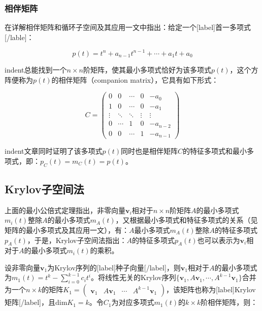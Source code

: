\documentclass[UTF8,nofonts]{ctexart}
\begin{document}
\subsubsection*{相伴矩阵}

在详解相伴矩阵和循环子空间及其应用一文中指出：给定一个[label]首一多项式[/lable]：

\[p(t)=t^n+a_{n-1}t^{n-1}+\cdots+a_1t+a_0\]

indent总能找到一个$n \times n$阶矩阵，使其最小多项式恰好为该多项式$p(t)$，这个方阵便称为$p(t)$的相伴矩阵（companion matrix），它具有如下形式：

\[
C=\begin{pmatrix}
0&0&\cdots&0&-a_0\\
1&0&\cdots&0&-a_1\\
\vdots&\ddots&\ddots&\vdots&\vdots\\
0&\cdots&1&0&-a_{n-2}\\
0&0&\cdots&1&-a_{n-1}
\end{pmatrix}
\]

indent文章同时证明了该多项式$p(t)$同时也是相伴矩阵$C$的特征多项式和最小多项式，即：$p_C(t)=m_C(t)=p(t)$。

\subsection*{Krylov子空间法}

上面的最小公倍式定理指出，非零向量$\boldsymbol{v}_i$相对于$n \times n$阶矩阵$A$的最小多项式$m_i(t)$整除$A$的最小多项式$m_A(t)$，又根据最小多项式和特征多项式的关系（见矩阵的最小多项式及其应用一文），有：$A$最小多项式$m_A(t)$整除$A$的特征多项式$p_A(t)$，于是，Krylov子空间法指出：$A$的特征多项式$p_A(t)$也可以表示为$\boldsymbol{v}_i$相对于$A$的最小多项式$m_i(t)$的乘积。

设非零向量$\boldsymbol{v}_1$为Krylov序列的[label]种子向量[/label]，则$\boldsymbol{v}_1$相对于$A$的最小多项式为$m_1(t)=t^k-\sum_{i=0}^{k-1}c_it^i$。将线性无关的Krylov序列$\{\boldsymbol{v}_1,A\boldsymbol{v}_1,\cdots,A^{k-1}\boldsymbol{v}_1\}$合并为一个$n \times k$的矩阵$K_1=\begin{pmatrix}\boldsymbol{v}_1&A\boldsymbol{v}_1&\cdots&A^{k-1}\boldsymbol{v}_1\end{pmatrix}$，该矩阵也称为[label]Krylov矩阵[/label]，且$\text{dim}K_1=k$。令$C_1$为对应多项式$m_1(t)$的$k \times k$阶相伴矩阵，则：
\end{document}
